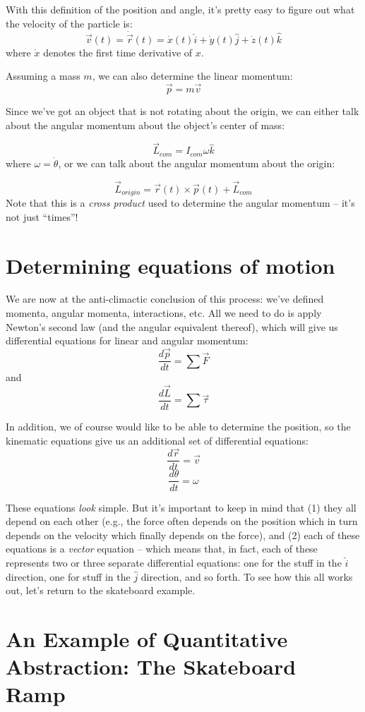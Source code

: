 \documentclass{tufte-handout}
\begin{document}
With this definition of the position and angle, it's pretty easy to figure out what the velocity of the particle is:
$$\vec{v}(t) = \dot{\vec{r}}(t) = \dot{x}(t) \hat{i} + \dot{y}(t) \hat{j} + \dot{z}(t) \hat{k}$$
where $\dot{x}$ denotes the first time derivative of $x$.  

Assuming a mass $m$, we can also determine the linear momentum:$$\vec{p} = m\vec{v}$$

Since we've got an object that is not rotating about the origin, we can either talk about the angular momentum about the object's center of mass:

$$\vec{L}_{com} = I_{com} \omega \hat{k}$$
where $\omega = \dot{\theta}$, or we can talk about the angular momentum about the origin:

$$\vec{L}_{origin} = \vec{r}(t) \times \vec{p}(t) + \vec{L}_{com}$$
Note that this is a {\it cross product} used to determine the angular momentum -- it's not just ``times''!
\section{Determining equations of motion}

We are now at the anti-climactic conclusion of this process:  we've defined momenta, angular momenta, interactions, etc.  All we need to do is apply Newton's second law (and the angular equivalent thereof), which will give us differential equations for linear and angular momentum:
$$\frac{d\vec{p}}{dt} = \sum \vec{F}$$
and
$$\frac{d \vec{L}}{dt} = \sum \vec{\tau}$$

In addition, we of course would like to be able to determine the position, so the kinematic equations give us an additional set of differential equations:
$$\frac{d\vec{r}}{dt} = \vec{v}$$
$$\frac{d\theta}{dt} = \omega$$


These equations {\it look} simple. But it's important to keep in mind that (1) they all depend on each other (e.g., the force often depends on the position which in turn depends on the velocity which finally depends on the force), and (2) each of these equations is a {\it vector} equation -- which means that, in fact, each of these represents two or three separate differential equations:  one for the stuff in the $\hat{i} $ direction, one for stuff in the $\hat{j}$ direction, and so forth. To see how this all works out, let's return to the skateboard example.


\section{An Example of Quantitative Abstraction: The Skateboard Ramp}
\end{document}
